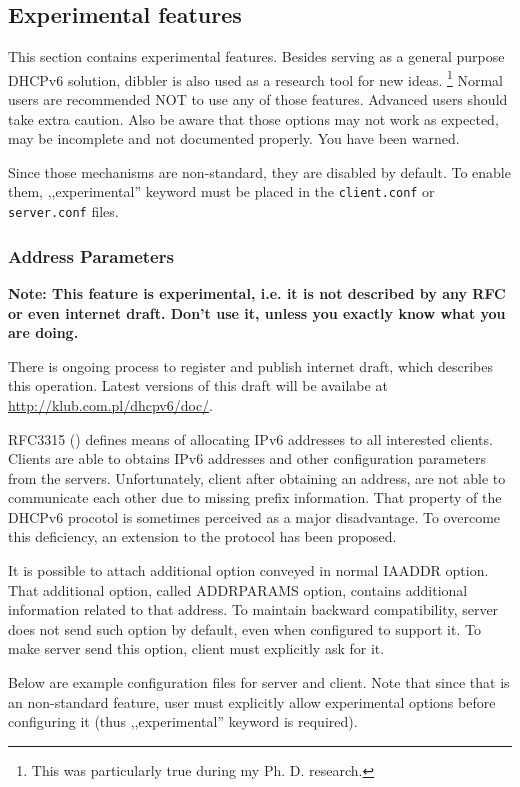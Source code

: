 \begin{enumerate}
\subsection{Experimental features}

This section contains experimental features. Besides serving as a
general purpose DHCPv6 solution, dibbler is also used as a research
tool for new ideas. \footnote{This was particularly true during my
  Ph. D. research.} Normal users are recommended NOT to use any
of those features. Advanced users should take extra caution. Also be
aware that those options may not work as expected, may be incomplete
and not documented properly. You have been warned.

Since those mechanisms are non-standard, they are disabled by
default. To enable them, ,,experimental'' keyword must be placed in
the \verb+client.conf+ or \verb+server.conf+ files.

\subsubsection{Address Parameters}
\label{feature-addr-params}
\textbf{Note: This feature is experimental, i.e. it is not described
by any RFC or even internet draft. Don't use it, unless you exactly
know what you are doing.}

There is ongoing process to register and publish internet draft,
which describes this operation. Latest versions of this draft will be
availabe at \url{http://klub.com.pl/dhcpv6/doc/}.

RFC3315 (\cite{rfc3315}) defines means of allocating IPv6 addresses to
all interested clients. Clients are able to obtains IPv6 addresses and
other configuration parameters from the servers. Unfortunately, client
after obtaining an address, are not able to communicate each other due
to missing prefix information. That property of the DHCPv6 procotol is
sometimes perceived as a major disadvantage. To overcome this
deficiency, an extension to the protocol has been proposed.

It is possible to attach additional option conveyed in normal IAADDR
option. That additional option, called ADDRPARAMS option, contains
additional information related to that address. To maintain backward
compatibility, server does not send such option by default, even when
configured to support it. To make server send this option, client must
explicitly ask for it.

Below are example configuration files for server and client. Note that
since that is an non-standard feature, user must explicitly allow
experimental options before configuring it (thus ,,experimental''
keyword is required).


\end{enumerate}
